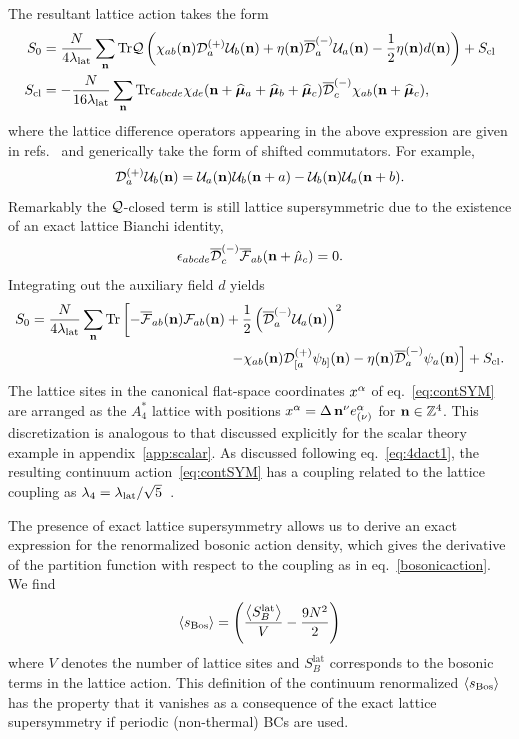 The resultant lattice action takes the form
\begin{align}
  S_0 & = \frac{N}{4\lambda_{\text{lat}}} \sum_{\mathbf{n}} \mathrm{Tr}{\mathcal Q \left(\chi_{ab}(\mathbf{n})\mathcal D_a^{(+)}\mathcal U_b(\mathbf{n}) + \eta(\mathbf{n}) \overline{\mathcal D}_a^{(-)}\mathcal U_a(\mathbf{n}) - \frac{1}{2}\eta(\mathbf{n}) d(\mathbf{n}) \right)} + S_{\text{cl}} \\
  S_{\text{cl}} & = -\frac{N}{16\lambda_{\text{lat}}} \sum_{\mathbf{n}} \mathrm{Tr}{\epsilon_{abcde} \chi_{de}(\mathbf{n} + \widehat{\boldsymbol{\mu}}_a + \widehat{\boldsymbol{\mu}}_b + \widehat{\boldsymbol{\mu}}_c) \overline{\mathcal D}^{(-)}_{c} \chi_{ab}(\mathbf{n} + \widehat{\boldsymbol{\mu}}_c)},
\end{align}
where the lattice difference operators appearing in the above expression are given in refs.~\cite{Catterall:2007kn, Damgaard:2008pa} and generically take the form of shifted commutators.
For example,
\begin{equation}
  \mathcal D_a^{(+)}\mathcal U_b(\mathbf{n}) = \mathcal U_a(\mathbf{n})\mathcal U_b(\mathbf{n} + a) - \mathcal U_b(\mathbf{n})\mathcal U_a(\mathbf{n} + b).
\end{equation}
Remarkably the $\mathcal Q$-closed term is still lattice supersymmetric due to the existence of an exact lattice Bianchi identity,
\begin{equation}
  \epsilon_{abcde} \overline{\mathcal D}^{(-)}_c \overline{\mathcal F}_{ab}(\mathbf{n} + \hat{\mu}_c) = 0.
\end{equation}
Integrating out the auxiliary field $d$ yields
\begin{equation}
  \label{eq:lat_act}
  \begin{split}
    S_0 & = \frac{N}{4\lalat} \sum_{\vn} \text{Tr}\left[-\cFbar_{ab}(\vn) \cF_{ab}(\vn) + \frac{1}{2}\left(\cDbar_a^{(-)}\cU_a(\vn)\right)^2 \right. \\
        & \hspace{5 cm} \left. - \chi_{ab}(\vn) \cD^{(+)}_{[a}\psi_{b]}(\vn) - \eta(\vn) \cDbar^{(-)}_a\psi_a(\vn)\right] + S_{\text{cl}}.
  \end{split}
\end{equation}
The lattice sites in the canonical flat-space coordinates $x^{\alpha}$ of eq.~\eqref{eq:contSYM} are arranged as the $A_4^*$ lattice with positions $x^{\alpha} = \Delta\, \mathbf{n}^{\nu} e_{(\nu)}^{\alpha}$ for $\mathbf{n} \in \mathbb{Z}^4$.
This discretization is analogous to that discussed explicitly for the scalar theory example in appendix~\ref{app:scalar}.
As discussed following eq.~\eqref{eq:4dact1}, the resulting continuum action~\eqref{eq:contSYM} has a coupling related to the lattice coupling as $\lambda_4 = \lambda_{\text{lat}} / \sqrt{5}$~\cite{Kaplan:2005ta, Catterall:2014vka}.

The presence of exact lattice supersymmetry allows us to derive an exact expression for the renormalized bosonic action density, which gives the derivative of the partition function with respect to the coupling as in eq.~\eqref{bosonicaction}.
We find
\begin{equation}
  \label{eq:subtraction}
  \left\langle s_{\text{Bos}} \right\rangle = \left( \frac{\left\langle S_B^{\text{lat}} \right\rangle}{V} - \frac{9N^2}{2} \right)
\end{equation}
where $V$ denotes the number of lattice sites and $S_B^{\text{lat}}$ corresponds to the bosonic terms in the lattice action.
This definition of the continuum renormalized $\left\langle s_{\text{Bos}} \right\rangle$ has the property that it vanishes as a consequence of the exact lattice supersymmetry if periodic (non-thermal) BCs are used.

